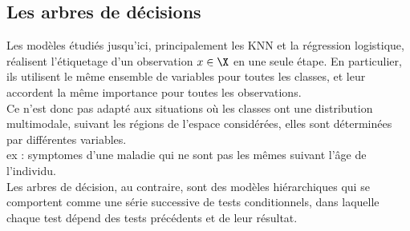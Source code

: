 \documentclass[10pt]{beamer}
\begin{document}




\subsection{Les arbres de décisions}

\begin{frame}
	Les modèles étudiés jusqu'ici, principalement les KNN et la régression logistique, réalisent l'étiquetage d'un observation $x \in \X$ en une seule étape. En particulier, ils utilisent le même ensemble de variables pour toutes les classes, et leur accordent la même importance pour toutes les observations.\\[1em]
	
	Ce n'est donc pas adapté aux situations où les classes ont une distribution multimodale, suivant les régions de l'espace considérées,  elles sont déterminées par différentes variables. \\
	\textcolor{MPTgrey}{ex : symptomes d'une maladie qui ne sont pas les mêmes suivant l'âge de l'individu.}\\[1em]
	
	Les arbres de décision, au contraire, sont des modèles hiérarchiques qui se comportent comme une série successive de tests conditionnels, dans laquelle chaque test dépend des tests précédents et de leur résultat. 
	
\end{frame}
\end{document}
